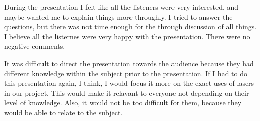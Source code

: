 During the presentation I felt like all the listeners were very interested, and maybe wanted me to explain things more throughly. I tried to answer the questions, but there was not time enough for the through discussion of all things. 
I believe all the listernes were very happy with the presentation. There were no negative comments. 


It was difficult to direct the presentation towards the audience because they had different knowledge within the subject prior to the presentation. If I had to do this presentation again, I think, I would focus it more on the exact uses of lasers in our project. This would make it relavant to everyone not depending on their level of knowledge. Also, it would not be too difficult for them, because they would be able to relate to the subject. 
